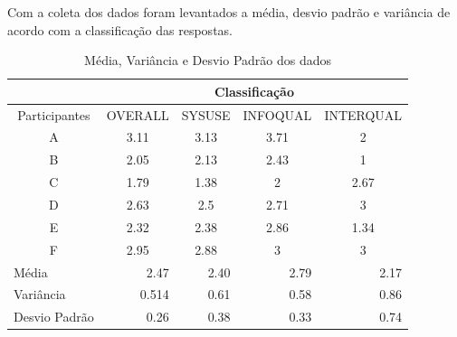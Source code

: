 Com a coleta dos dados foram levantados a média, desvio padrão e variância de acordo com a classificação das respostas. 

\begin{table}[H]
\begin{tabular}{|c|c|c|c|c|}
\hline
\multicolumn{1}{|l|}{}              & \multicolumn{4}{c|}{Classificação}                                                                             \\ \hline
Participantes                       & OVERALL                    & SYSUSE                    & INFOQUAL                  & INTERQUAL                 \\ \hline
A                                   & 3.11                       & 3.13                      & 3.71                      & 2                         \\ \hline
B                                   & 2.05                       & 2.13                      & 2.43                      & 1                         \\ \hline
C                                   & 1.79                       & 1.38                      & 2                         & 2.67                      \\ \hline
D                                   & 2.63                       & 2.5                       & 2.71                      & 3                         \\ \hline
E                                   & 2.32                       & 2.38                      & 2.86                      & 1.34                      \\ \hline
F                                   & 2.95                       & 2.88                      & 3                         & 3                         \\ \hline
\multicolumn{1}{|l|}{Média}         & \multicolumn{1}{r|}{2.47}  & \multicolumn{1}{r|}{2.40} & \multicolumn{1}{r|}{2.79} & \multicolumn{1}{r|}{2.17} \\ \hline
\multicolumn{1}{|l|}{Variância}     & \multicolumn{1}{r|}{0.514} & \multicolumn{1}{r|}{0.61} & \multicolumn{1}{r|}{0.58} & \multicolumn{1}{r|}{0.86} \\ \hline
\multicolumn{1}{|l|}{Desvio Padrão} & \multicolumn{1}{r|}{0.26}  & \multicolumn{1}{r|}{0.38} & \multicolumn{1}{r|}{0.33} & \multicolumn{1}{r|}{0.74} \\ \hline
\end{tabular}
\caption{Média, Variância e Desvio Padrão dos dados}
\end{table}

